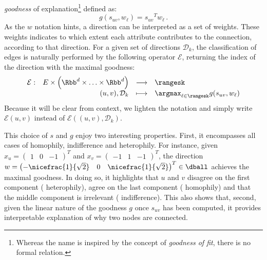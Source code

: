 \begin{enumerate}[1),nosep,leftmargin=*]
    \emph{goodness} of explanation\footnote{Whereas the name is inspired by the concept of
    \emph{goodness of fit}, there is no formal relation.} defined as:
    \begin{equation*}
      g(s_{uv}, w_\ell) = {s_{uv}}^T w_\ell \, .
    \end{equation*}
    As the $w$ notation hints, a direction can be interpreted as a set of weights. These weights
    indicates to which extent each attribute contributes to the connection, according to that
    direction. For a given set of directions $\mathcal{D}_k$, the classification of edges is
    naturally performed by the following operator $\mathcal{E}$, returning the index of the
    direction with the maximal goodness:
    \begin{equation*}
      \begin{array}[t]{lrcl}
        \mathcal{E} : & E \times \left( \Rbb^d \times \ldots \times \Rbb^d \right)
                      & \longrightarrow & \rangesk \\
                      & (u,v), \mathcal{D}_k & \longmapsto
                      & \argmax_{\ell \in \rangesk} g(s_{uv}, w_\ell)
      \end{array}
    \end{equation*}
    Because it will be clear from context, we lighten the notation and simply write $\mathcal{E}(u,
    v)$ instead of $\mathcal{E}\left((u, v), \mathcal{D}_k \right)$.
\end{enumerate}

This choice of $s$ and $g$ enjoy two interesting properties. First, it encompasses all cases of
homophily, indifference and heterophily. For instance, given $x_u = \begin{pmatrix} 1 & 0 & -1
\end{pmatrix}^T$ and $x_v = \begin{pmatrix} -1 & 1 & -1 \end{pmatrix}^T$, the direction $w =
\begin{pmatrix} -\nicefrac{1}{\sqrt{2}} & 0 & \nicefrac{1}{\sqrt{2}} \end{pmatrix}^T \in \dball$
achieves the maximal goodness. In doing so, it highlights that $u$ and $v$ disagree on the first
component (\ie{} heterophily), agree on the last component (\ie{} homophily) and that the middle
component is irrelevant (\ie{} indifference). This also shows that, second, given the linear nature
of the goodness $g$ once $s_{uv}$ has been computed, it provides interpretable explanation of why
two nodes are connected.

